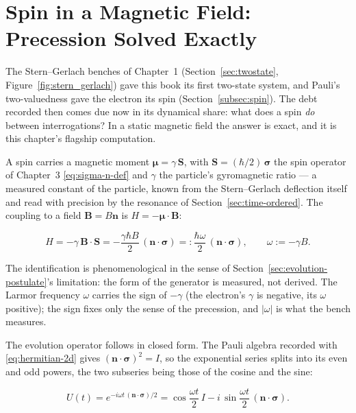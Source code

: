 \section{Spin in a Magnetic Field: Precession Solved Exactly}
\label{sec:spin-precession}

The Stern--Gerlach benches of Chapter~1 (Section~\ref{sec:twostate}, Figure~\ref{fig:stern_gerlach}) gave this book its first two-state system, and Pauli's two-valuedness gave the electron its spin (Section~\ref{subsec:spin}). The debt recorded then comes due now in its dynamical share: what does a spin \emph{do} between interrogations? In a static magnetic field the answer is exact, and it is this chapter's flagship computation.

A spin carries a magnetic moment $\bm\mu = \gamma\,\bm S$, with $\bm S = (\hbar/2)\,\bm\sigma$ the spin operator of Chapter~3 \eqref{eq:sigma-n-def} and $\gamma$ the particle's gyromagnetic ratio --- a measured constant of the particle, known from the Stern--Gerlach deflection itself and read with precision by the resonance of Section~\ref{sec:time-ordered}. The coupling to a field $\bm B = B\bm n$ is $H = -\bm\mu\cdot\bm B$:
\begin{linenomath}
    \begin{equation*}
        H = -\gamma\,\bm B\cdot\bm S = -\frac{\gamma\hbar B}{2}\,(\bm n\cdot\bm\sigma) =: \frac{\hbar\omega}{2}\,(\bm n\cdot\bm\sigma), \qquad \omega := -\gamma B .
    \end{equation*}
\end{linenomath}
The identification is phenomenological in the sense of Section~\ref{sec:evolution-postulate}'s limitation: the form of the generator is measured, not derived. The Larmor frequency $\omega$ carries the sign of $-\gamma$ (the electron's $\gamma$ is negative, its $\omega$ positive); the sign fixes only the sense of the precession, and $|\omega|$ is what the bench measures.

The evolution operator follows in closed form. The Pauli algebra recorded with \eqref{eq:hermitian-2d} gives $(\bm n\cdot\bm\sigma)^2 = I$, so the exponential series splits into its even and odd powers, the two subseries being those of the cosine and the sine:
\begin{linenomath}
    \begin{equation}
        U(t) = e^{-i\omega t\,(\bm n\cdot\bm\sigma)/2} = \cos\frac{\omega t}{2}\,I - i\,\sin\frac{\omega t}{2}\,(\bm n\cdot\bm\sigma) .
        \label{eq:larmor-evolution}
    \end{equation}
\end{linenomath}

